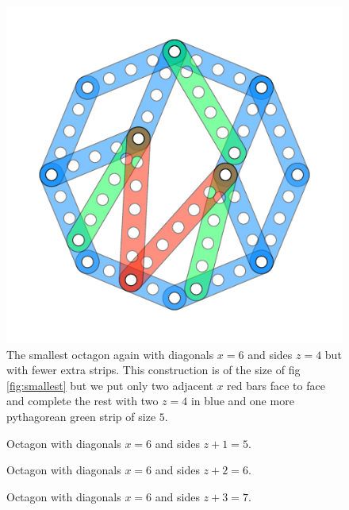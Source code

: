 \documentclass[11pt]{article}
\begin{document}
\begin{figure}
\centering
\includegraphics[]{figs/octagon-4}
\caption{The smallest octagon again with diagonals $x=6$ and sides $z=4$
but with fewer extra strips.
This construction is of the size of fig \ref{fig:smallest} but we put only
two adjacent $x$ red bars face to face and complete the rest with two
$z=4$ in blue and one more pythagorean green strip of size $5$.
}
\label{fig:smallest-simpler}
\end{figure}

\begin{figure}
\centering
{}
\caption{Octagon with diagonals $x=6$ and sides $z+1=5$.}
\label{fig:second}
\end{figure}

\begin{figure}
\centering
{}
\caption{Octagon with diagonals $x=6$ and sides $z+2=6$.}
\label{fig:third}
\end{figure}

\begin{figure}
\centering
{}
\caption{Octagon with diagonals $x=6$ and sides $z+3=7$.}
\label{fig:fourth}
\end{figure}
\end{document}
